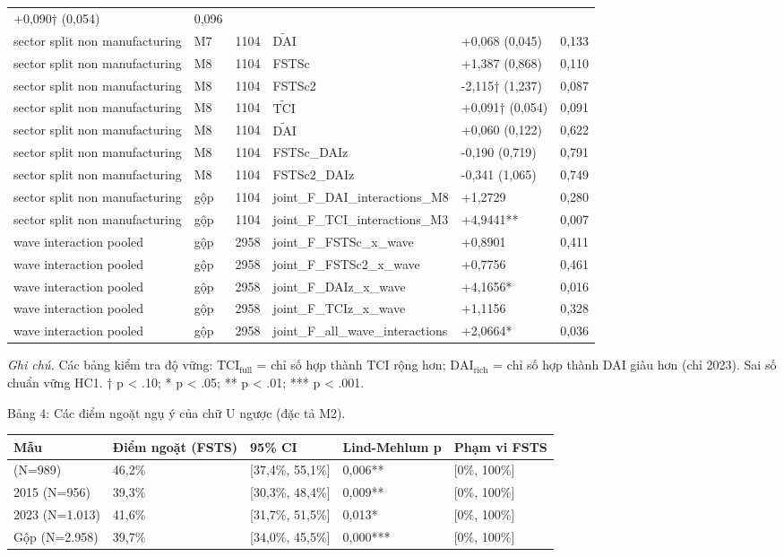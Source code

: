 \documentclass[12pt,a4paper]{article}
\begin{document}
\begin{longtable}[]{@{}llllll@{}}
+0,090† (0,054) & 0,096 \\
sector split non manufacturing & M7 & 1104 & \(\tilde{\mathrm{DAI}}\) &
+0,068 (0,045) & 0,133 \\
sector split non manufacturing & M8 & 1104 & FSTSc & +1,387 (0,868) &
0,110 \\
sector split non manufacturing & M8 & 1104 & FSTSc2 & -2,115† (1,237) &
0,087 \\
sector split non manufacturing & M8 & 1104 & \(\tilde{\mathrm{TCI}}\) &
+0,091† (0,054) & 0,091 \\
sector split non manufacturing & M8 & 1104 & \(\tilde{\mathrm{DAI}}\) &
+0,060 (0,122) & 0,622 \\
sector split non manufacturing & M8 & 1104 & FSTSc\_DAIz & -0,190
(0,719) & 0,791 \\
sector split non manufacturing & M8 & 1104 & FSTSc2\_DAIz & -0,341
(1,065) & 0,749 \\
sector split non manufacturing & gộp & 1104 &
joint\_F\_DAI\_interactions\_M8 & +1,2729 & 0,280 \\
sector split non manufacturing & gộp & 1104 &
joint\_F\_TCI\_interactions\_M3 & +4,9441** & 0,007 \\
wave interaction pooled & gộp & 2958 & joint\_F\_FSTSc\_x\_wave &
+0,8901 & 0,411 \\
wave interaction pooled & gộp & 2958 & joint\_F\_FSTSc2\_x\_wave &
+0,7756 & 0,461 \\
wave interaction pooled & gộp & 2958 & joint\_F\_DAIz\_x\_wave &
+4,1656* & 0,016 \\
wave interaction pooled & gộp & 2958 & joint\_F\_TCIz\_x\_wave & +1,1156
& 0,328 \\
wave interaction pooled & gộp & 2958 & joint\_F\_all\_wave\_interactions
& +2,0664* & 0,036 \\
\end{longtable}

\emph{Ghi chú.} Các bảng kiểm tra độ vững:
\(\mathrm{TCI}_{\text{full}}\) = chỉ số hợp thành TCI rộng hơn;
\(\mathrm{DAI}_{\text{rich}}\) = chỉ số hợp thành DAI giàu hơn (chỉ
2023). Sai số chuẩn vững HC1. † p \textless{} .10; * p \textless{} .05;
** p \textless{} .01; *** p \textless{} .001.

Bảng 4: Các điểm ngoặt ngụ ý của chữ U ngược (đặc tả M2).

\begin{longtable}[]{@{}lllll@{}}
\toprule\noalign{}
Mẫu & Điểm ngoặt (FSTS) & 95\% CI & Lind-Mehlum p & Phạm vi FSTS \\
\midrule\noalign{}
\endhead
\bottomrule\noalign{}
\endlastfoot
2009 (N=989) & 46,2\% & {[}37,4\%, 55,1\%{]} & 0,006** & {[}0\%,
100\%{]} \\
2015 (N=956) & 39,3\% & {[}30,3\%, 48,4\%{]} & 0,009** & {[}0\%,
100\%{]} \\
2023 (N=1.013) & 41,6\% & {[}31,7\%, 51,5\%{]} & 0,013* & {[}0\%,
100\%{]} \\
Gộp (N=2.958) & 39,7\% & {[}34,0\%, 45,5\%{]} & 0,000*** & {[}0\%,
100\%{]} \\
\end{longtable}
\end{document}
